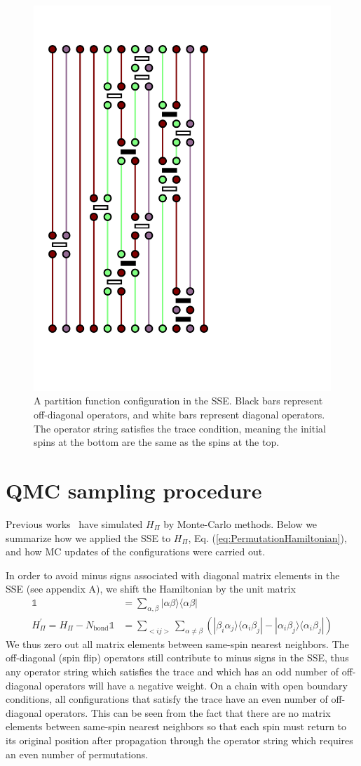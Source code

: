 \documentclass[aps,prb,reprint,floatfix]{revtex4-1}
\begin{document}
\begin{figure}
\centerline{\includegraphics[angle=0,width=.5\columnwidth]{Zconfig.pdf}}
\caption{A partition function configuration in the SSE.  Black bars represent off-diagonal operators, and white bars represent diagonal operators.  The operator string satisfies the trace condition, meaning the initial spins at the bottom are the same as the spins at the top.}
\label{fig:Zconfiguration}
\end{figure}

\section{QMC sampling procedure}\label{app_b}

Previous works~\cite{Frischmuth1999:ThermoSU4,Messio2012:entropyDep} have simulated $H_\Pi$ by Monte-Carlo methods. Below we summarize how we applied the SSE to $H_\Pi$, Eq. (\ref{eq:PermutationHamiltonian}), and how MC updates of the configurations were carried out. 

In order to avoid minus signs associated with diagonal matrix elements in the SSE (see appendix A), we shift the Hamiltonian by the unit matrix
{\allowdisplaybreaks
\begin{equation}
\begin{split}
		\mathds{1}&=\sum_{\alpha,\beta} |\alpha\beta\rangle\langle\alpha\beta| \\
		H^{'}_{\Pi} =H_{\Pi}-N_{\mathrm{bond}}\mathds{1}&= \sum_{<ij>}\sum_{\alpha\neq\beta}(|\beta_{i}\alpha_{j}\rangle\langle\alpha_{i}\beta_{j}|-|\alpha_{i}\beta_{j}\rangle\langle\alpha_{i}\beta_{j}|)  
\end{split}
\label{eq:ShiftedPermutationHamiltonian}
\end{equation}}
We thus zero out all matrix elements between same-spin nearest neighbors.  The off-diagonal (spin flip) operators still contribute to minus signs in the SSE, thus any operator string which satisfies the trace and which has an odd number of off-diagonal operators will have a negative weight.  On a chain with open boundary conditions, all configurations that satisfy the trace have an even number of off-diagonal operators.  This can be seen from the fact that there are no matrix elements between same-spin nearest neighbors so that each spin must return to its original position after propagation through the operator string which requires an even number of permutations.  
\end{document}
